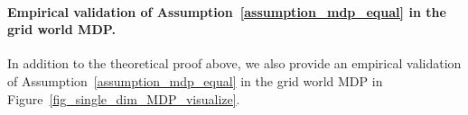 \begin{myproof}

    
\end{myproof}















\paragraph{Empirical validation of Assumption~\ref{assumption_mdp_equal} in the grid world MDP.}

In addition to the theoretical proof above, we also provide an empirical validation of Assumption~\ref{assumption_mdp_equal} in the grid world MDP in Figure~\ref{fig_single_dim_MDP_visualize}.
 
